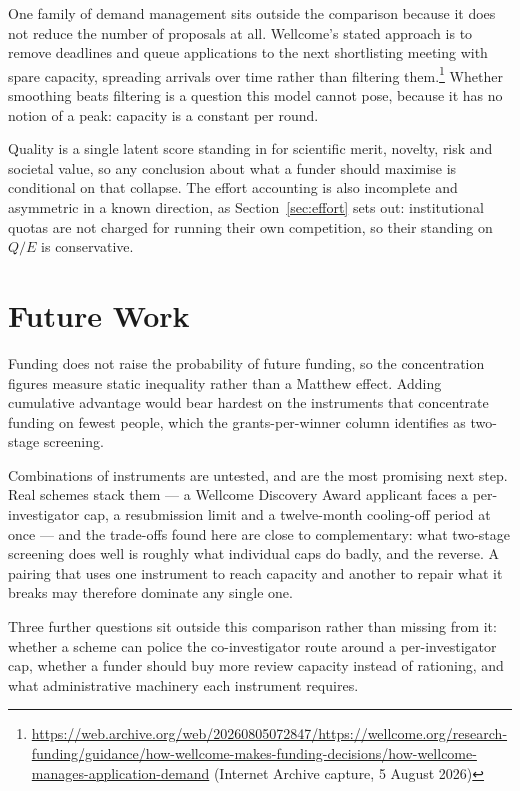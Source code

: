 \documentclass[11pt,a4paper]{article}
\newcommand{\wa}[2]{\url{#1} (Internet Archive capture, #2)}
\begin{document}
One family of demand management sits outside the comparison because it does not
reduce the number of proposals at all. Wellcome's stated approach is to remove
deadlines and queue applications to the next shortlisting meeting with spare
capacity, spreading arrivals over time rather than filtering
them.\footnote{\wa{https://web.archive.org/web/20260805072847/https://wellcome.org/research-funding/guidance/how-wellcome-makes-funding-decisions/how-wellcome-manages-application-demand}{5 August 2026}}
Whether smoothing beats filtering is a question this model cannot pose, because it
has no notion of a peak: capacity is a constant per round.

Quality is a single latent score standing in for scientific merit, novelty, risk
and societal value, so any conclusion about what a funder should maximise is
conditional on that collapse. The effort accounting is also incomplete and
asymmetric in a known direction, as Section~\ref{sec:effort} sets out: institutional
quotas are not charged for running their own competition, so their standing on
$Q/E$ is conservative.

\section{Future Work}
\label{sec:future}

Funding does not raise the probability of future funding, so the concentration
figures measure static inequality rather than a Matthew effect. Adding cumulative
advantage would bear hardest on the instruments that concentrate funding on
fewest people, which the grants-per-winner column identifies as two-stage
screening.

Combinations of instruments are untested, and are the most promising next step.
Real schemes stack them --- a Wellcome Discovery Award applicant faces a
per-investigator cap, a resubmission limit and a twelve-month cooling-off period
at once --- and the trade-offs found here are close to complementary: what two-stage screening does well is roughly what individual caps
do badly, and the reverse. A pairing that uses one instrument to reach capacity
and another to repair what it breaks may therefore dominate any single one.

Three further questions sit outside this comparison rather than missing from it:
whether a scheme can police the co-investigator route around a per-investigator
cap, whether a funder should buy more review capacity instead of rationing, and
what administrative machinery each instrument requires.
\end{document}
